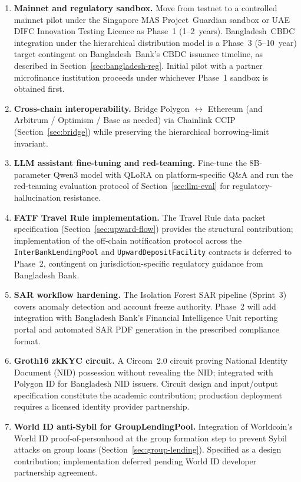 \documentclass[12pt,a4paper]{report}
\begin{document}
\begin{enumerate}[noitemsep]
\item \textbf{Mainnet and regulatory sandbox.} Move from testnet to a controlled mainnet pilot under the Singapore MAS Project~Guardian sandbox or UAE DIFC Innovation Testing Licence as Phase~1 (1--2~years). Bangladesh~CBDC integration under the hierarchical distribution model is a Phase~3 (5--10~year) target contingent on Bangladesh~Bank's CBDC issuance timeline, as described in Section~\ref{sec:bangladesh-reg}. Initial pilot with a partner microfinance institution proceeds under whichever Phase~1 sandbox is obtained first.
\item \textbf{Cross-chain interoperability.} Bridge Polygon $\leftrightarrow$ Ethereum (and Arbitrum / Optimism / Base as needed) via Chainlink CCIP (Section~\ref{sec:bridge}) while preserving the hierarchical borrowing-limit invariant.
\item \textbf{LLM assistant fine-tuning and red-teaming.} Fine-tune the 8B-parameter Qwen3 model with QLoRA on platform-specific Q\&A and run the red-teaming evaluation protocol of Section~\ref{sec:llm-eval} for regulatory-hallucination resistance.

\item \textbf{FATF Travel Rule implementation.} The Travel Rule data packet specification (Section~\ref{sec:upward-flow}) provides the structural contribution; implementation of the off-chain notification protocol across the \texttt{InterBankLendingPool} and \texttt{UpwardDepositFacility} contracts is deferred to Phase~2, contingent on jurisdiction-specific regulatory guidance from Bangladesh Bank.

\item \textbf{SAR workflow hardening.} The Isolation Forest SAR pipeline (Sprint~3) covers anomaly detection and account freeze authority. Phase~2 will add integration with Bangladesh Bank's Financial Intelligence Unit reporting portal and automated SAR PDF generation in the prescribed compliance format.

\item \textbf{Groth16 zkKYC circuit.} A Circom~2.0 circuit proving National Identity Document (NID) possession without revealing the NID; integrated with Polygon ID for Bangladesh NID issuers. Circuit design and input/output specification constitute the academic contribution; production deployment requires a licensed identity provider partnership.

\item \textbf{World ID anti-Sybil for GroupLendingPool.} Integration of Worldcoin's World ID proof-of-personhood at the group formation step to prevent Sybil attacks on group loans (Section~\ref{sec:group-lending}). Specified as a design contribution; implementation deferred pending World ID developer partnership agreement.


\end{enumerate}
\end{document}

